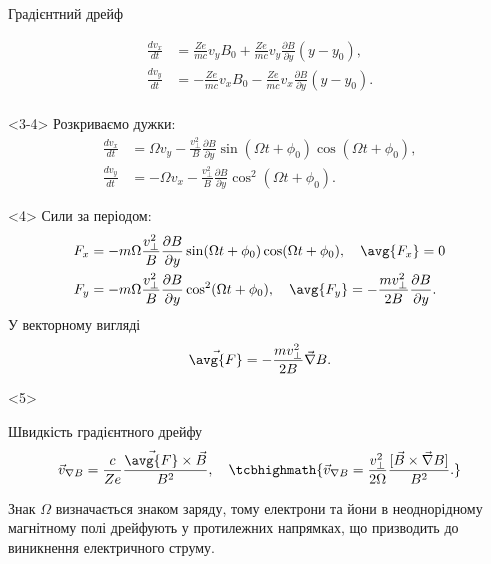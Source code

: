\documentclass[]{beamer}
\begin{document}
\begin{frame}{Градієнтний дрейф}{}
\begin{onlyenv}
\begin{align*}
			\frac{dv_x}{dt} & = \frac{Ze}{mc}v_yB_0 + \frac{Ze}{mc}v_y \frac{\partial B}{\partial y} (y - y_0),  \\
			\frac{dv_y}{dt} & = -\frac{Ze}{mc}v_xB_0 - \frac{Ze}{mc}v_x \frac{\partial B}{\partial y} (y - y_0). \\
		\end{align*}
	\end{onlyenv}
	\begin{onlyenv}<3-4>\small
		Розкриваємо дужки:
		\begin{align*}
			\frac{dv_x}{dt} & = \Omega v_y - \frac{v^2_\perp}{B} \frac{\partial B}{\partial y} \sin(\Omega t + \phi_0) \cos(\Omega t + \phi_0) , \\
			\frac{dv_y}{dt} & = -\Omega v_x - \frac{v^2_\perp}{B}\frac{\partial B}{\partial y}   \cos^2(\Omega t + \phi_0).
		\end{align*}
	\end{onlyenv}
	\begin{onlyenv}\small
		Сили за періодом:
		\begin{align*}
			F_x & = - m\Omega \frac{v^2_\perp}{B} \frac{\partial B}{\partial y}  \sin(\Omega t + \phi_0) \cos(\Omega t + \phi_0), \quad   \avg{F_x} = 0                             \\
			F_y & = - m\Omega \frac{v^2_\perp}{B} \frac{\partial B}{\partial y} \cos^2(\Omega t + \phi_0), \quad \avg{F_y} = - \frac{mv^2_\perp}{2B} \frac{\partial B}{\partial y}.
		\end{align*}
		У векторному вигляді
		\begin{equation*}
			\vec{\avg{F}} = - \frac{mv^2_\perp}{2B}\vec\nabla B.
		\end{equation*}
	\end{onlyenv}
	\begin{onlyenv}\small
		\begin{block}{Швидкість градієнтного дрейфу}
			\begin{equation*}
				\vec{v}_{\nabla B} = \frac{c}{Ze}\frac{\vec{\avg{F}}\times\vec{B}}{B^2}, \quad \tcbhighmath{
					\vec{v}_{\nabla B} =  \frac{v^2_\perp}{2\Omega}\frac{[\vec{B}\times\vec{\nabla}B]}{B^2}.
				}
			\end{equation*}
		\end{block}
		Знак $ \Omega $ визначається знаком заряду, тому електрони та йони в неоднорідному магнітному полі дрейфують у протилежних напрямках, що призводить до виникнення електричного струму.
		\begin{center}
			
		\end{center}
	\end{onlyenv}
\end{frame}
\end{document}
